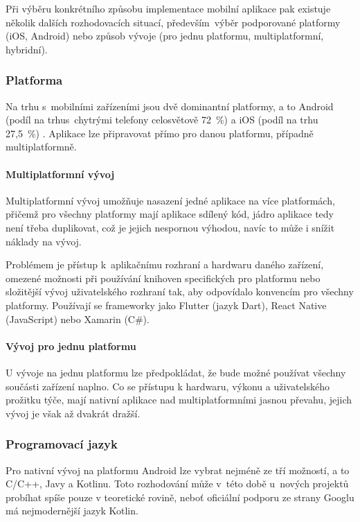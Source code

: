 \documentclass[twoside]{ctuthesis}
\begin{document}
Při výběru konkrétního způsobu implementace mobilní aplikace pak existuje několik dalších rozhodovacích situací, především~výběr podporované platformy (iOS, Android) nebo způsob vývoje (pro jednu platformu, multiplatformní, hybridní).

\subsubsection{Platforma}
Na trhu s~mobilními zařízeními jsou dvě dominantní platformy, a to Android (podíl na trhus~chytrými telefony celosvětově 72~\%) a iOS (podíl na trhu 27,5~\%) \cite{statcounter2021mobile}. Aplikace lze připravovat přímo pro danou platformu, případně multiplatformně.


\paragraph{Multiplatformní vývoj}
Multiplatformní vývoj umožňuje nasazení jedné aplikace na více platformách, přičemž pro všechny platformy mají aplikace sdílený kód, jádro aplikace tedy není třeba duplikovat, což je jejich nespornou výhodou, navíc to může i snížit náklady na vývoj.

Problémem je přístup k~aplikačnímu rozhraní a hardwaru daného zařízení, omezené možnosti při používání knihoven specifických pro platformu nebo složitější vývoj uživatelského rozhraní tak, aby odpovídalo konvencím pro všechny platformy. \cite{manchanda2020where}   Používají se frameworky jako Flutter (jazyk Dart), React Native (JavaScript) nebo Xamarin (C\#).

\paragraph{Vývoj pro jednu platformu}
U vývoje na jednu platformu lze předpokládat, že bude možné používat všechny součásti zařízení naplno. Co se přístupu k hardwaru, výkonu a uživatelského prožitku týče, mají nativní aplikace nad multiplatformními jasnou převahu, jejich vývoj je však až dvakrát dražší. \cite{dennis2018native}


\subsubsection{Programovací jazyk}
Pro nativní vývoj na platformu Android lze vybrat nejméně ze tří možností, a to C/C++, Javy a Kotlinu. Toto rozhodování může v~této době u~nových projektů probíhat spíše pouze v teoretické rovině, neboť oficiální podporu ze strany Googlu má nejmodernější jazyk Kotlin.
\end{document}
